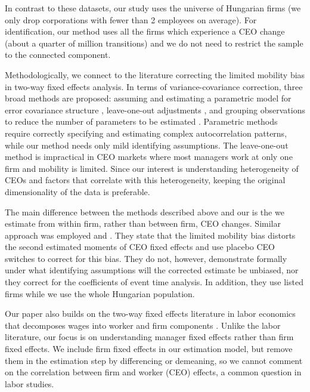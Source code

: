 \documentclass[sigconf,nonacm]{acmart}
\begin{document}
In contrast to these datasets, our study uses the universe of Hungarian firms (we only drop corporations with fewer than 2 employees on average). For identification, our method uses all the firms which experience a CEO change (about a quarter of million transitions) and we do not need to restrict the sample to the connected component. 

Methodologically, we connect to the literature correcting the limited mobility bias in two-way fixed effects analysis. In terms of variance-covariance correction, three broad methods are proposed: assuming and estimating a parametric model for error covariance structure \citep{andrews2008high,gaure2014correlation,kline2024firm,koren2026gmrf}, leave-one-out adjustments \citep{kline2020leave}, and grouping observations to reduce the number of parameters to be estimated \citep{Bonhomme2019-xi}. Parametric methods require correctly specifying and estimating complex autocorrelation patterns, while our method needs only mild identifying assumptions. The leave-one-out method is impractical in CEO markets where most managers work at only one firm and mobility is limited. Since our interest is understanding heterogeneity of CEOs and factors that correlate with this heterogeneity, keeping the original dimensionality of the data is preferable. 

The main difference between the methods described above and our is the we estimate from within firm, rather than between firm, CEO changes. Similar approach was employed \cite{fitza2014use} and \cite{jarosiewicz2023revisiting}. They state that the limited mobility bias distorts the second estimated moments of CEO fixed effects and use placebo CEO switches to correct for this bias. They do not, however, demonstrate formally under what identifying assumptions will the corrected estimate be unbiased, nor they correct for the coefficients of event time analysis. In addition, they use listed firms while we use the whole Hungarian population. 


Our paper also builds on the two-way fixed effects literature in labor economics that decomposes wages into worker and firm components \citep{kline2024firm}. Unlike the labor literature, our focus is on understanding manager fixed effects rather than firm fixed effects. We include firm fixed effects in our estimation model, but remove them in the estimation step by differencing or demeaning, so we cannot comment on the correlation between firm and worker (CEO) effects, a common question in labor studies.
\end{document}
